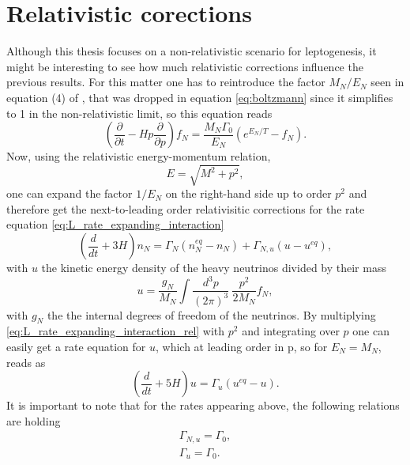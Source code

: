 \section{Relativistic corections}
Although this thesis focuses on a non-relativistic scenario for leptogenesis, it might be interesting to see how much relativistic corrections influence the previous results. For this matter one has to reintroduce the factor $M_{N}/E_{N}$ seen in equation (4) of \cite{Bodeker:2013qaa}, that was dropped in equation \eqref{eq:boltzmann} since it simplifies to 1 in the non-relativistic limit, so this equation reads
\begin{equation}
	\left(\frac{\partial}{\partial t}-Hp\frac{\partial}{\partial p}\right)f_N=\frac{M_N\Gamma_0}{E_N}\left(e^{E_N/T}-f_N\right).
	\label{eq:boltzmann_2}
\end{equation}
Now, using the relativistic energy-momentum relation,
\begin{equation}
	E=\sqrt{M^2+p^2},
	\label{eq:rel_energy_momentum}
\end{equation}
one can expand the factor $1/E_N$ on the right-hand side up to order $p^2$ and therefore get the next-to-leading order relativisitic corrections for the rate equation \eqref{eq:L_rate_expanding_interaction}
\begin{equation}
\left(\frac{d}{dt}+3H\right)n_N=\Gamma_N\left(n_N^{eq}-n_N\right)+\Gamma_{N,u}\left(u-u^{eq}\right),
\label{eq:L_rate_expanding_interaction_rel}
\end{equation}
with $u$ the kinetic energy density of the heavy neutrinos divided by their mass
\begin{equation}
	u=\frac{g_N}{M_N}\int\frac{d^3p}{(2\pi)^3}\:\frac{p^2}{2M_N}f_N,
	\label{eq:energy_density}
\end{equation}
with $g_N$ the the internal degrees of freedom of the neutrinos. \newline\indent
By multiplying \eqref{eq:L_rate_expanding_interaction_rel} with $p^2$ and integrating over $p$ one can easily get a rate equation for $u$, which at leading order in p, so for $E_N=M_N$, reads as
\begin{equation}
	\left(\frac{d}{dt}+5H\right)u=\Gamma_u\left(u^{eq}-u\right).
	\label{eq:rate_u}
\end{equation}
It is important to note that for the rates appearing above, the following relations are holding
\begin{align}
	\Gamma_{N,u}=\Gamma_{0},
	\label{eq:Gamma_N,u}
	\\
	\Gamma_{u}=\Gamma_{0}.
	\label{eq:Gamma_u}
\end{align}
